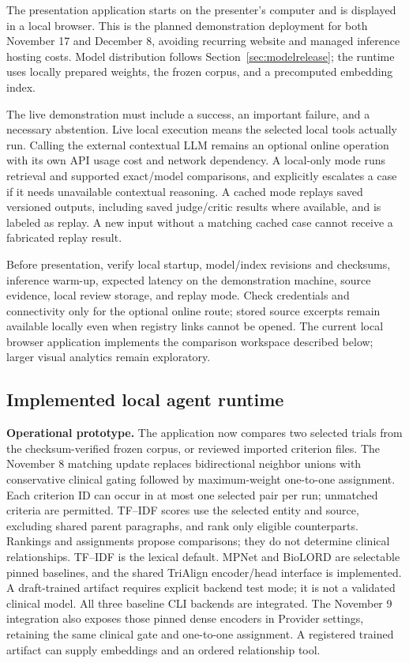 \documentclass[10pt,letterpaper]{article}
\begin{document}
The presentation application starts on the presenter's computer and is
displayed in a local browser. This is the planned demonstration deployment
for both November 17 and December 8, avoiding recurring website and managed
inference hosting costs. Model distribution follows
Section~\ref{sec:modelrelease}; the runtime uses locally prepared weights,
the frozen corpus, and a precomputed embedding index.

The live demonstration must include a success, an important failure, and a
necessary abstention. Live local execution means the selected local tools
actually run. Calling the external contextual LLM remains an optional online
operation with its own API usage cost and network dependency. A local-only
mode runs retrieval and supported exact/model comparisons, and explicitly
escalates a case if it needs unavailable contextual reasoning. A cached mode
replays saved versioned outputs, including saved judge/critic results where
available, and is labeled as replay. A new input without a matching cached
case cannot receive a fabricated replay result.

Before presentation,
verify local startup, model/index revisions and checksums, inference warm-up,
expected latency on the demonstration machine, source evidence, local review
storage, and replay mode. Check credentials and connectivity only for the
optional online route; stored source excerpts remain available locally even
when registry links cannot be opened. The current local browser application implements the comparison workspace described below; larger visual analytics remain exploratory.

\subsection{Implemented local agent runtime}
\label{sec:workingruntime}
\textbf{Operational prototype.} The application now compares two selected trials
from the checksum-verified frozen corpus, or reviewed imported criterion files.
The November 8 matching update replaces bidirectional neighbor unions with
conservative clinical gating followed by maximum-weight one-to-one assignment.
Each criterion ID can occur in at most one selected pair per run; unmatched
criteria are permitted. TF--IDF scores use the selected entity and source,
excluding shared parent paragraphs, and rank only eligible counterparts.
Rankings and assignments propose comparisons; they do not determine clinical
relationships. TF--IDF is the lexical default. MPNet and BioLORD are selectable pinned
baselines, and the shared TriAlign encoder/head interface is implemented.
A draft-trained artifact requires explicit backend test mode; it is not
a validated clinical model. All three baseline CLI backends are integrated.
The November 9 integration also exposes those pinned dense encoders in Provider
settings, retaining the same clinical gate and one-to-one assignment. A registered
trained artifact can supply embeddings and an ordered relationship tool.
\end{document}
